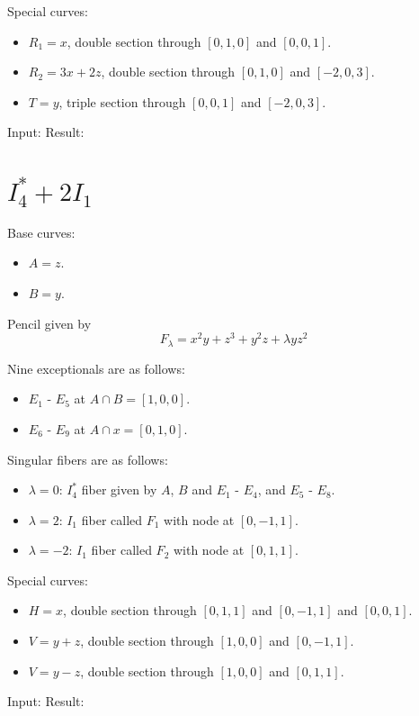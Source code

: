 \documentclass{article}
\begin{document}
Special curves:
\begin{itemize}
  \item $R_1 = x$, double section through $[0,1,0]$ and $[0,0,1]$.
  \item $R_2 = 3x + 2z$, double section through $[0,1,0]$ and $[-2,0,3]$.
  \item $T = y$, triple section through $[0,0,1]$ and $[-2,0,3]$.
\end{itemize}
Input:
%
Result:
%






\section{$I_4^* + 2I_1$}

Base curves:
\begin{itemize}
  \item $A = z$.
  \item $B = y$.
\end{itemize}
Pencil given by
\[F_\lambda = x^2y + z^3 + y^2z + \lambda yz^2\]

Nine exceptionals are as follows:
\begin{itemize}
  \item $E_1$ - $E_5$ at $A \cap B = [1,0,0]$.
  \item $E_6$ - $E_9$ at $A \cap x = [0,1,0]$.
\end{itemize}
Singular fibers are as follows:
\begin{itemize}
  \item $\lambda = 0$: $I_4^*$ fiber given by $A$, $B$ and $E_1$ - $E_4$, and $E_5$ - $E_8$.
  \item $\lambda = 2$: $I_1$ fiber called $F_1$ with node at $[0,-1,1]$.
  \item $\lambda = -2$: $I_1$ fiber called $F_2$ with node at $[0,1,1]$.
\end{itemize}

Special curves:
\begin{itemize}
  \item $H = x$, double section through $[0,1,1]$ and $[0,-1,1]$ and $[0,0,1]$.
  \item $V = y + z$, double section through $[1,0,0]$ and $[0,-1,1]$.
  \item $V = y - z$, double section through $[1,0,0]$ and $[0,1,1]$.
\end{itemize}
Input:
%
Result:
%
\end{document}
